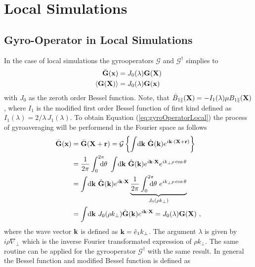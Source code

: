 \section{Local Simulations}
\label{sec:localSimulation}

\subsection{Gyro-Operator in Local Simulations}
\label{sub:gyroOperatorLocal}

In the case of local simulations the gyrooperators $\mathcal{G}$ and $\mathcal{G}^\dagger$ simplies to
\begin{gather}
    \begin{aligned}
        \bar{\boldsymbol{\mathbf{G}}}(\boldsymbol{\mathbf{x}}) &= J_0(\lambda) \boldsymbol{\mathbf{G}}(\boldsymbol{\mathbf{X}}) \\
        \langle\boldsymbol{\mathbf{G}}(\boldsymbol{\mathbf{X}})\rangle &= J_0(\lambda) \boldsymbol{\mathbf{G}}(\boldsymbol{\mathbf{x}})
    \end{aligned}
    \label{eq:gyroOperatorLocal}
\end{gather}
with $J_0$ as the zeroth order Bessel function. Note, that $\bar{B}_{1\parallel}(\boldsymbol{\mathbf{X}}) = - I_1(\lambda)\mu B_{1\parallel} (\boldsymbol{\mathbf{X}})$, where $I_1$ is the modified first order Bessel function of first kind defined as $I_1(\lambda) = 2/\lambda \, J_1(\lambda)$. To obtain Equation (\ref{eq:gyroOperatorLocal}) the process of gyroaveraging will be performend in the Fourier space as follows
\begin{gather}
    \begin{aligned}
        \ga{\vect{G}}(\x) &= \ga{\vect{G}}(\X + \vect{r}) = \tga{\left\{\ints \mathrm{d}\vect{k} ~ \hat{\vect{G}}(\vect{k}) e^{i \vect{k} \cdot (\X + \vect{r})} \right\}} \\
                          &= \frac{1}{2\pi} \intss{0}{2\pi} \dtheta ~ \ints \mathrm{d}\vect{k} ~ \hat{\vect{G}}(\vect{k}) e^{i \vect{k} \cdot \X} e^{ i k_\perp \rho \cos \theta} \\
                          &= \ints \mathrm{d}\vect{k} ~ \hat{\vect{G}}(\vect{k}) e^{i \vect{k} \cdot \X} \underbrace{\frac{1}{2\pi} \intss{0}{2\pi} \dtheta ~ e^{ i k_\perp \rho \cos \theta}}_{J_0(\rho k_\perp)}\\
                          &= \ints \mathrm{d}\vect{k} ~ J_0(\rho k_\perp) \hat{\vect{G}}(\vect{k}) e^{i \vect{k} \cdot \X} = J_0(\lambda) \vect{G}(\X)~,
    \end{aligned}
    \label{eq:gyroOperatorLocalDerivation}
\end{gather}
where the wave vector $\boldsymbol{\mathbf{k}}$ is defined as $\boldsymbol{\mathbf{k}} = \hat{e}_1 k_\perp$. The argument $\lambda$ is given by $i \rho \nabla_{\!\perp}$ which is the inverse Fourier transformated expression of $\rho k_\perp$. The same routine can be applied for the gyrooperator $\mathcal{G}^\dagger$ with the same result. In general the Bessel function and modified Bessel function is defined as \cite{Dannert_PHD}
